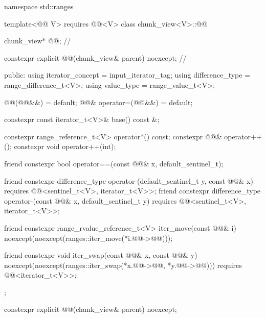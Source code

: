 %
\begin{codeblock}
namespace std::ranges {
  template<@@ V>
    requires @@<V>
  class chunk_view<V>::@@ {
    chunk_view* @@;                                                // \expos

    constexpr explicit @@(chunk_view& parent) noexcept;     // \expos

  public:
    using iterator_concept = input_iterator_tag;
    using difference_type = range_difference_t<V>;
    using value_type = range_value_t<V>;

    @@(@@&&) = default;
    @@& operator=(@@&&) = default;

    constexpr const iterator_t<V>& base() const &;

    constexpr range_reference_t<V> operator*() const;
    constexpr @@& operator++();
    constexpr void operator++(int);

    friend constexpr bool operator==(const @@& x, default_sentinel_t);

    friend constexpr difference_type operator-(default_sentinel_t y, const @@& x)
      requires @@<sentinel_t<V>, iterator_t<V>>;
    friend constexpr difference_type operator-(const @@& x, default_sentinel_t y)
      requires @@<sentinel_t<V>, iterator_t<V>>;

    friend constexpr range_rvalue_reference_t<V> iter_move(const @@& i)
      noexcept(noexcept(ranges::iter_move(*i.@@->@@)));

    friend constexpr void iter_swap(const @@& x, const @@& y)
      noexcept(noexcept(ranges::iter_swap(*x.@@->@@, *y.@@->@@)))
      requires @@<iterator_t<V>>;
  };
}
\end{codeblock}

\begin{itemdecl}
constexpr explicit @@(chunk_view& parent) noexcept;
\end{itemdecl}

